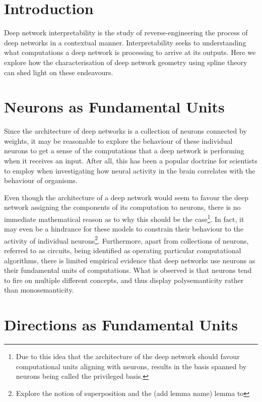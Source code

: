 \section{Introduction}

Deep network interpretability is the study of reverse-engineering the process of deep networks in a contextual manner. Interpretability seeks to understanding what computations a deep network is processing to arrive at its outputs. Here we explore how the characterisation of deep network geometry using spline theory can shed light on these endeavours.

\section{Neurons as Fundamental Units}\label{sec:neurons_as_units}

Since the architecture of deep networks is a collection of neurons connected by weights, it may be reasonable to explore the behaviour of these individual neurons to get a sense of the computations that a deep network is performing when it receives an input. After all, this has been a popular doctrine for scientists to employ when investigating how neural activity in the brain correlates with the behaviour of organisms. 

Even though the architecture of a deep network would seem to favour the deep network assigning the components of its computation to neurons, there is no immediate mathematical reason as to why this should be the case\footnote{Due to this idea that the architecture of the deep network should favour computational units aligning with neurons, results in the basis spanned by neurons being called the privileged basis.}. In fact, it may even be a hindrance for these models to constrain their behaviour to the activity of individual neurons\footnote{Explore the notion of superposition and the (add lemma name) lemma to }. Furthermore, apart from collections of neurons, referred to as circuits, being identified as operating particular computational algorithms, there is limited empirical evidence that deep networks use neurons as their fundamental units of computations. What is observed is that neurons tend to fire on multiple different concepts, and thus display polysemanticity rather than monosemanticity. 

\section{Directions as Fundamental Units}\label{sec:directions_as_units}

